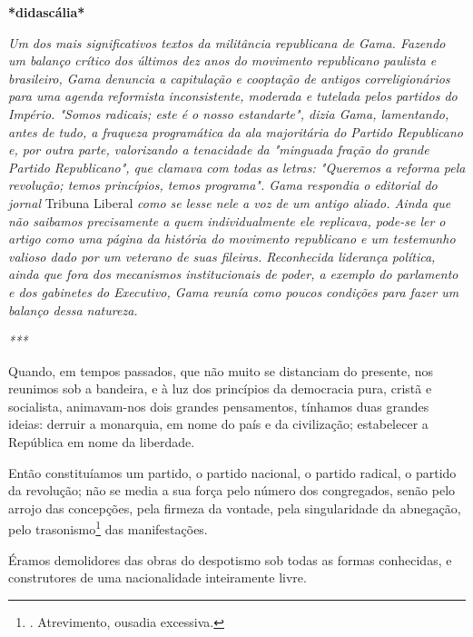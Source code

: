 \textbf{*didascália*}

\emph{Um dos mais significativos textos da militância republicana de
Gama. Fazendo um balanço crítico dos últimos dez anos do movimento
republicano paulista e brasileiro, Gama denuncia a capitulação e
cooptação de antigos correligionários para uma agenda reformista
inconsistente, moderada e tutelada pelos partidos do Império. "Somos
radicais; este é o nosso estandarte", dizia Gama, lamentando, antes de
tudo, a fraqueza programática da ala majoritária do Partido Republicano
e, por outra parte, valorizando a tenacidade da "minguada fração do
grande Partido Republicano", que clamava com todas as letras: "Queremos
a reforma pela revolução; temos princípios, temos programa". Gama
respondia o editorial do jornal} Tribuna Liberal \emph{como se lesse
nele a voz de um antigo aliado. Ainda que não saibamos precisamente a
quem individualmente ele replicava, pode-se ler o artigo como uma página
da história do movimento republicano e um testemunho valioso dado por um
veterano de suas fileiras. Reconhecida liderança política, ainda que
fora dos mecanismos institucionais de poder, a exemplo do parlamento e
dos gabinetes do Executivo, Gama reunía como poucos condições para fazer
um balanço dessa natureza. }

\emph{***}

Quando, em tempos passados, que não muito se distanciam do presente, nos
reunimos sob a bandeira, e à luz dos princípios da democracia pura,
cristã e socialista, animavam-nos dois grandes pensamentos, tínhamos
duas grandes ideias: derruir a monarquia, em nome do país e da
civilização; estabelecer a República em nome da liberdade.

Então constituíamos um partido, o partido nacional, o partido radical, o
partido da revolução; não se media a sua força pelo número dos
congregados, senão pelo arrojo das concepções, pela firmeza da vontade,
pela singularidade da abnegação, pelo trasonismo\footnote{. Atrevimento,
  ousadia excessiva.} das manifestações.

Éramos demolidores das obras do despotismo sob todas as formas
conhecidas, e construtores de uma nacionalidade inteiramente livre.

